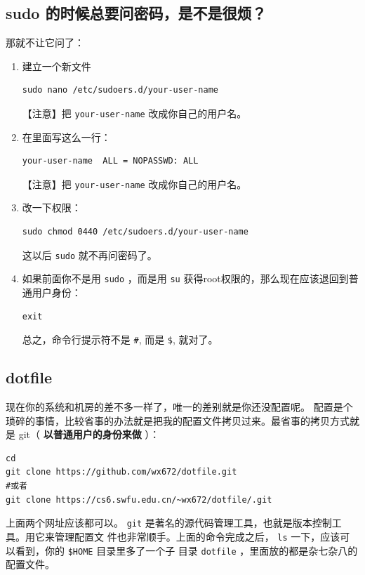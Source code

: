 \documentclass{wx672ctexart} \usepackage{hyperref}
\begin{document}
\subsection{sudo 的时候总要问密码，是不是很烦？}
\label{sec:org5e59d5a}
那就不让它问了：
\begin{enumerate}
\item 建立一个新文件
\begin{verbatim}
sudo nano /etc/sudoers.d/your-user-name
\end{verbatim}

【注意】把 \texttt{your-user-name} 改成你自己的用户名。

\item 在里面写这么一行：
\begin{verbatim}
your-user-name  ALL = NOPASSWD: ALL
\end{verbatim}

【注意】把 \texttt{your-user-name} 改成你自己的用户名。
\item 改一下权限：
\begin{verbatim}
sudo chmod 0440 /etc/sudoers.d/your-user-name
\end{verbatim}

这以后 \texttt{sudo} 就不再问密码了。

\item 如果前面你不是用 \texttt{sudo} ，而是用 \texttt{su} 获得root权限的，那么现在应该退回到普通用户身份：
\begin{verbatim}
exit
\end{verbatim}

总之，命令行提示符不是 \texttt{\#}, 而是 \texttt{\$}, 就对了。
\end{enumerate}

\subsection{dotfile}
\label{sec:org90f7f21}
现在你的系统和机房的差不多一样了，唯一的差别就是你还没配置呢。
配置是个琐碎的事情，比较省事的办法就是把我的配置文件拷贝过来。最省事的拷贝方式就是
git（ \textbf{以普通用户的身份来做} ）：
\begin{verbatim}
cd
git clone https://github.com/wx672/dotfile.git
#或者
git clone https://cs6.swfu.edu.cn/~wx672/dotfile/.git
\end{verbatim}

上面两个网址应该都可以。 \texttt{git} 是著名的源代码管理工具，也就是版本控制工具。用它来管理配置文
件也非常顺手。上面的命令完成之后， \texttt{ls} 一下，应该可以看到，你的 \texttt{\$HOME} 目录里多了一个子
目录 \texttt{dotfile} ，里面放的都是杂七杂八的配置文件。
\end{document}
